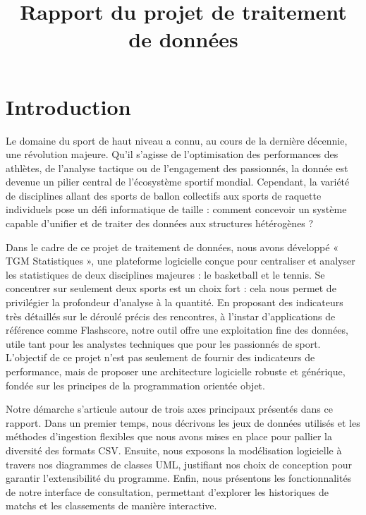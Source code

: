 \documentclass[
  french,
  letterpaper,
  DIV=11,
  numbers=noendperiod]{scrartcl}
\title{Rapport du projet de traitement de données}
\author{}
\date{}
\renewcommand*\contentsname{Table des matières}
\newcommand\contentsname{Table des matières}
\begin{document}
\maketitle
\thispagestyle{empty}
\newpage

\setcounter{page}{1}

\renewcommand{\contentsname}{Sommaire}

\tableofcontents

\newpage

\section*{Introduction}\label{introduction}

Le domaine du sport de haut niveau a connu, au cours de la dernière
décennie, une révolution majeure. Qu'il s'agisse de l'optimisation des
performances des athlètes, de l'analyse tactique ou de l'engagement des
passionnés, la donnée est devenue un pilier central de l'écosystème
sportif mondial. Cependant, la variété de disciplines allant des sports
de ballon collectifs aux sports de raquette individuels pose un défi
informatique de taille : comment concevoir un système capable d'unifier
et de traiter des données aux structures hétérogènes ?

Dans le cadre de ce projet de traitement de données, nous avons
développé « TGM Statistiques », une plateforme logicielle conçue pour
centraliser et analyser les statistiques de deux disciplines majeures :
le basketball et le tennis. Se concentrer sur seulement deux sports est
un choix fort : cela nous permet de privilégier la profondeur d'analyse
à la quantité. En proposant des indicateurs très détaillés sur le
déroulé précis des rencontres, à l'instar d'applications de référence
comme Flashscore, notre outil offre une exploitation fine des données,
utile tant pour les analystes techniques que pour les passionnés de
sport. L'objectif de ce projet n'est pas seulement de fournir des
indicateurs de performance, mais de proposer une architecture logicielle
robuste et générique, fondée sur les principes de la programmation
orientée objet.

Notre démarche s'articule autour de trois axes principaux présentés dans
ce rapport. Dans un premier temps, nous décrivons les jeux de données
utilisés et les méthodes d'ingestion flexibles que nous avons mises en
place pour pallier la diversité des formats CSV. Ensuite, nous exposons
la modélisation logicielle à travers nos diagrammes de classes UML,
justifiant nos choix de conception pour garantir l'extensibilité du
programme. Enfin, nous présentons les fonctionnalités de notre interface
de consultation, permettant d'explorer les historiques de matchs et les
classements de manière interactive.
\end{document}
